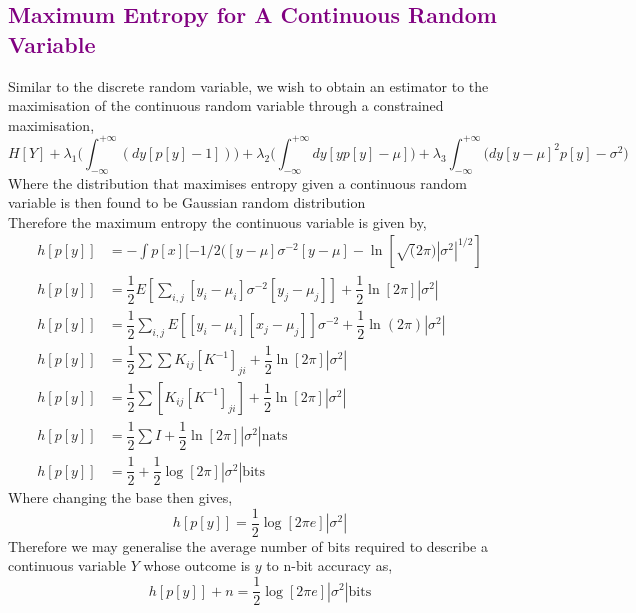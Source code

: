 \documentclass[7pt]{article}
\begin{document}

\subsection*{\textcolor{purple}{Maximum Entropy for A Continuous Random Variable}}

Similar to the discrete random variable, we wish to obtain an estimator to the maximisation of the continuous random variable through a constrained maximisation,
$$
H[Y] +\lambda_1 \Biggr(  \int_{-\infty}^{+\infty} (dy [p[y] - 1]) \Biggl) + \lambda_2 \Biggr(  \int_{-\infty}^{+\infty} dy [y p[y]  - \mu] \Biggl) + \lambda_3  \int_{-\infty}^{+\infty} \Biggr( dy [ y - \mu]^2 p[y]  - \sigma^2 \Biggl)
$$
Where the distribution that maximises entropy given a continuous random variable is then found to be Gaussian random distribution
\begin{equation}
\end{equation}
Therefore the maximum entropy  the continuous  variable is given by,
\begin{equation}
\begin{split}
h[p[y]] & = - \int p[x] [ -1/2 ([y - \mu] \sigma^{-2}  [y - \mu] - \ln [\sqrt(2 \pi) |\sigma^2|^{1/2}] \\
h[p[y]] & = \dfrac{1}{2} E [ \sum_{i,j} [y_i - \mu_i] \sigma^{-2}[y_j- \mu_j]] +\dfrac{1}{2} \ln[2 \pi] |\sigma^2| \\
h[p[y]] & = \dfrac{1}{2} \sum_{i,j} E [  [y_i - \mu_i] [x_j- \mu_j]]\sigma^{-2}  +\dfrac{1}{2} \ln(2 \pi) |\sigma^2| \\
h[p[y]] &= \dfrac{1}{2} \sum \sum K_{ij} [K^{-1}]_{ji} + \dfrac{1}{2} \ln [2 \pi] | \sigma^2 | \\
 h[p[y]] & = \dfrac{1}{2} \sum [ K_{ij} [K^{-1}]_{ji} ] + \dfrac{1}{2} \ln [2 \pi] | \sigma^2 | \\
 h[p[y]] &= \dfrac{1}{2} \sum I + \dfrac{1}{2} \ln [2 \pi] | \sigma^2 | \text{nats} \\
 h[p[y]] &= \dfrac{1}{2} + \dfrac{1}{2} \log [2 \pi] | \sigma^2 | \text{bits}
\end{split}
\end{equation}
Where changing the base then gives,
$$
 h[p[y]] = \dfrac{1}{2} \log [2 \pi e] | \sigma^2 |
$$
Therefore we may generalise the average number of bits required to describe a continuous variable $Y$ whose outcome is $y$ to n-bit accuracy as,
$$
 h[p[y]]  + n  =  \dfrac{1}{2} \log [2 \pi e] | \sigma^2 | \text{bits}
$$
\end{document}
